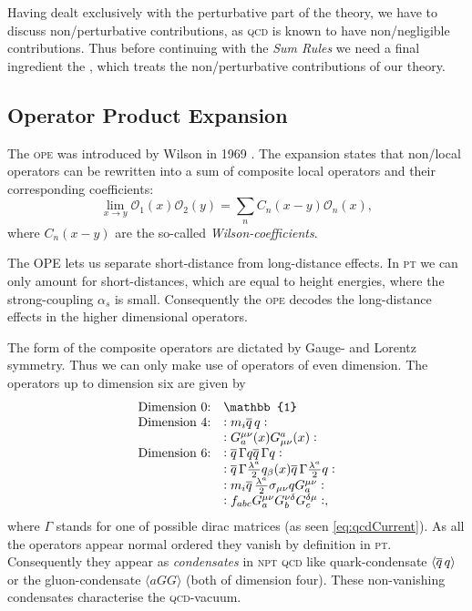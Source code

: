 \documentclass[../../index.tex]{subfiles}
\begin{document}
Having dealt exclusively with the perturbative part of the theory, we have to
discuss non\-/perturbative contributions, as \textsc{qcd} is known to have
non\-/negligible contributions. Thus before continuing with the \textit{Sum
  Rules} we need a final ingredient the , which treats the non\-/perturbative contributions of our theory.


\subsection{Operator Product Expansion}
The \textsc{ope} was introduced by Wilson in 1969 \cite{Wilson1969}. The
expansion states that non\-/local operators can be rewritten into a sum of
composite local operators and their corresponding coefficients:
\begin{equation}
  \label{eq:ope}
  \lim_{x\to y} \mathcal{O}_1(x) \mathcal{O}_2(y) = \sum_n C_n(x-y)\mathcal{O}_n(x),
\end{equation}
where $C_n(x-y)$ are the so-called \textit{Wilson-coefficients}.

The OPE lets us separate short-distance from long-distance effects. In
\textsc{pt} we can only amount for short-distances, which are equal to height
energies, where the strong-coupling $\alpha_s$ is small. Consequently the \textsc{ope}
decodes the long-distance effects in the higher dimensional operators.

The form of the composite operators are dictated by Gauge- and Lorentz symmetry.
Thus we can only make use of operators of even dimension. The operators up to
dimension six are given by \cite{Pascual1984}
\begin{equation}
  \begin{array}{ll}
    \text{Dimension 0:} & \mathbb{1} \\
    \text{Dimension 4:} & :m_i \anti{q} q: \\
                        & :G_a^{\mu\nu}(x) G_{\mu\nu}^a(x): \\
    \text{Dimension 6:} & :\anti{q} \Gamma q \anti{q} \Gamma q: \\
                        & :\anti{q} \Gamma \frac{\lambda^a}{2} q_\beta(x) \anti{q} \Gamma \frac{\lambda^a}{2} q: \\
                        & :m_i \anti{q} \frac{\lambda^a}{2} \sigma_{\mu\nu} q G^{\mu\nu}_a: \\
                        & :f_{abc} G_a^{\mu\nu} G_b^{\nu\delta} G_c^{\delta\mu}:,
  \end{array}
\end{equation}
where $\Gamma$ stands for one of possible dirac matrices (as seen
\cref{eq:qcdCurrent}). As all the operators appear normal ordered they vanish by
definition in \textsc{pt}. Consequently they appear as \textit{condensates} in
\textsc{npt qcd} like quark-condensate $\langle \overline{q}\, q \rangle$ or
the gluon-condensate $\langle a GG \rangle$ (both of dimension four). These
non-vanishing condensates characterise the \textsc{qcd}-vacuum.
\end{document}
